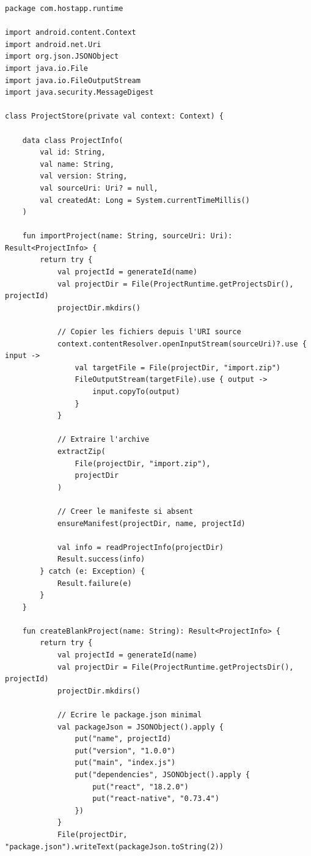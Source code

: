 \documentclass[11pt]{article}
\begin{document}
\begin{verbatim}
package com.hostapp.runtime

import android.content.Context
import android.net.Uri
import org.json.JSONObject
import java.io.File
import java.io.FileOutputStream
import java.security.MessageDigest

class ProjectStore(private val context: Context) {

    data class ProjectInfo(
        val id: String,
        val name: String,
        val version: String,
        val sourceUri: Uri? = null,
        val createdAt: Long = System.currentTimeMillis()
    )

    fun importProject(name: String, sourceUri: Uri): Result<ProjectInfo> {
        return try {
            val projectId = generateId(name)
            val projectDir = File(ProjectRuntime.getProjectsDir(), projectId)
            projectDir.mkdirs()

            // Copier les fichiers depuis l'URI source
            context.contentResolver.openInputStream(sourceUri)?.use { input ->
                val targetFile = File(projectDir, "import.zip")
                FileOutputStream(targetFile).use { output ->
                    input.copyTo(output)
                }
            }

            // Extraire l'archive
            extractZip(
                File(projectDir, "import.zip"),
                projectDir
            )

            // Creer le manifeste si absent
            ensureManifest(projectDir, name, projectId)

            val info = readProjectInfo(projectDir)
            Result.success(info)
        } catch (e: Exception) {
            Result.failure(e)
        }
    }

    fun createBlankProject(name: String): Result<ProjectInfo> {
        return try {
            val projectId = generateId(name)
            val projectDir = File(ProjectRuntime.getProjectsDir(), projectId)
            projectDir.mkdirs()

            // Ecrire le package.json minimal
            val packageJson = JSONObject().apply {
                put("name", projectId)
                put("version", "1.0.0")
                put("main", "index.js")
                put("dependencies", JSONObject().apply {
                    put("react", "18.2.0")
                    put("react-native", "0.73.4")
                })
            }
            File(projectDir, "package.json").writeText(packageJson.toString(2))


\end{verbatim}
\end{document}
